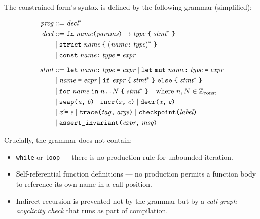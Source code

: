 \documentclass[11pt,a4paper]{article}
\begin{document}
The constrained form's syntax is defined by the following grammar (simplified):

\begin{align*}
  \textit{prog}  &::= \textit{decl}^* \\
  \textit{decl}  &::= \texttt{fn}\; \textit{name}\texttt{(}\textit{params}\texttt{)} \to \textit{type}\; \texttt{\{}\; \textit{stmt}^*\; \texttt{\}} \\
                 &\;|\; \texttt{struct}\; \textit{name}\; \texttt{\{}\; (\textit{name}\texttt{:}\;\textit{type})^*\; \texttt{\}} \\
                 &\;|\; \texttt{const}\; \textit{name}\texttt{:}\;\textit{type}\; \texttt{=}\; \textit{expr} \\[6pt]
  \textit{stmt}  &::= \texttt{let}\; \textit{name}\texttt{:}\;\textit{type}\; \texttt{=}\; \textit{expr}
                 \;|\; \texttt{let\;mut}\; \textit{name}\texttt{:}\;\textit{type}\; \texttt{=}\; \textit{expr} \\
                 &\;|\; \textit{name}\; \texttt{=}\; \textit{expr}
                 \;|\; \texttt{if}\; \textit{expr}\; \texttt{\{}\;\textit{stmt}^*\;\texttt{\}}\; \texttt{else}\; \texttt{\{}\;\textit{stmt}^*\;\texttt{\}} \\
                 &\;|\; \texttt{for}\; \textit{name}\; \texttt{in}\; n\texttt{..}N\; \texttt{\{}\;\textit{stmt}^*\;\texttt{\}}
                       \quad \text{where } n, N \in \mathbb{Z}_{\text{const}} \\
                 &\;|\; \texttt{swap}\texttt{(}\textit{a}\texttt{,}\;\textit{b}\texttt{)}
                 \;|\; \texttt{incr}\texttt{(}\textit{x}\texttt{,}\;\textit{e}\texttt{)}
                 \;|\; \texttt{decr}\texttt{(}\textit{x}\texttt{,}\;\textit{e}\texttt{)} \\
                 &\;|\; \textit{x}\; \hat{}\texttt{=}\; \textit{e}
                 \;|\; \texttt{trace}\texttt{(}\textit{tag}\texttt{,}\;\textit{args}\texttt{)}
                 \;|\; \texttt{checkpoint}\texttt{(}\textit{label}\texttt{)} \\
                 &\;|\; \texttt{assert\_invariant}\texttt{(}\textit{expr}\texttt{,}\;\textit{msg}\texttt{)}
\end{align*}

Crucially, the grammar does not contain:
\begin{itemize}[nosep]
  \item \texttt{while} or \texttt{loop} --- there is no production rule for
    unbounded iteration.
  \item Self-referential function definitions --- no production permits a
    function body to reference its own name in a call position.
  \item Indirect recursion is prevented not by the grammar but by a
    \emph{call-graph acyclicity check} that runs as part of compilation.
\end{itemize}
\end{document}
